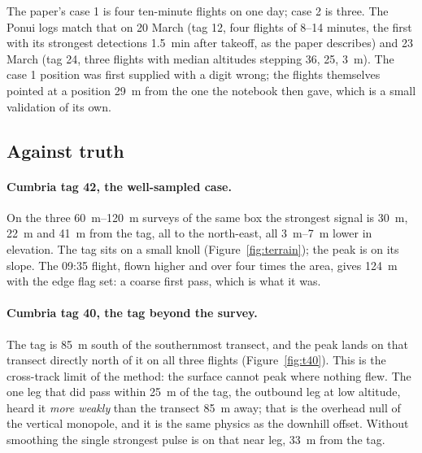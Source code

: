 \documentclass[11pt,a4paper]{article}
\begin{document}
The paper's case 1 is four ten-minute flights on one day; case 2 is three. The Ponui logs
match that on 20 March (tag 12, four flights of 8--14 minutes, the first with its strongest
detections \SI{1.5}{min} after takeoff, as the paper describes) and 23 March (tag 24, three
flights with median altitudes stepping 36, 25, \SI{3}{m}). The case 1 position was first
supplied with a digit wrong; the flights themselves pointed at a position \SI{29}{m} from the
one the notebook then gave, which is a small validation of its own.

\subsection{Against truth}

\begin{table}[htbp]
\centering
\resizebox{\textwidth}{!}{}
\caption{Every case with a known tag position, at the defaults. Offset is from the tag to
the strongest signal, with its compass direction; $\Delta z$ is the elevation of the peak
minus that of the tag; downhill is the component of the offset along the local downhill
direction at the tag, positive when the peak is on the downhill side; bearing error is the
estimate minus the true bearing from the centre of the selection to the tag. \emph{Weak}
and \emph{edge} are the report's own flags.}
\label{tab:cases}
\end{table}

\paragraph{Cumbria tag 42, the well-sampled case.} On the three \SI{60}{m}--\SI{120}{m}
surveys of the same box the strongest signal is \SI{30}{m}, \SI{22}{m} and \SI{41}{m} from
the tag, all to the north-east, all \SIrange{3}{7}{m} lower in elevation. The tag sits on a
small knoll (Figure~\ref{fig:terrain}); the peak is on its slope. The 09:35 flight, flown
higher and over four times the area, gives \SI{124}{m} with the edge flag set: a coarse
first pass, which is what it was.

\paragraph{Cumbria tag 40, the tag beyond the survey.} The tag is \SI{85}{m} south of the
southernmost transect, and the peak lands on that transect directly north of it on all
three flights (Figure~\ref{fig:t40}). This is the cross-track limit of the method:
the surface cannot peak where nothing flew. The one leg that did pass within \SI{25}{m} of the
tag, the outbound leg at low altitude, heard it \emph{more weakly} than the transect
\SI{85}{m} away; that is the overhead null of the vertical monopole, and it is the same
physics as the downhill offset. Without smoothing the single strongest pulse is on that
near leg, \SI{33}{m} from the tag.
\end{document}
